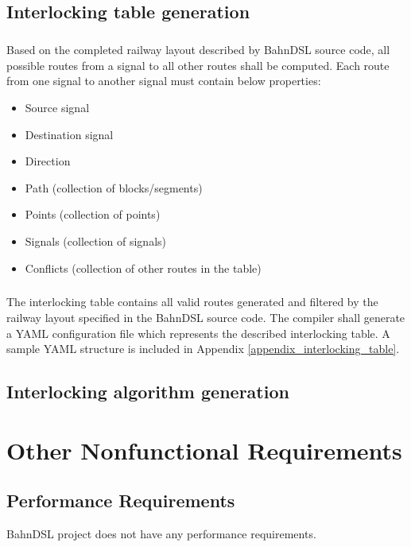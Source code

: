 \documentclass[a4paper,11pt]{scrreprt}
\begin{document}
\section{Interlocking table generation}
\paragraph{}Based on the completed railway layout described by BahnDSL source code, all possible routes from a signal to all other routes shall be computed. Each route from one signal to another signal must contain below properties:
\begin{itemize}
    \item Source signal
    \item Destination signal
    \item Direction
    \item Path (collection of blocks/segments)
    \item Points (collection of points)
    \item Signals (collection of signals)
    \item Conflicts (collection of other routes in the table)
\end{itemize}

\paragraph{}The interlocking table contains all valid routes generated and filtered by the railway layout specified in the BahnDSL source code. The compiler shall generate a YAML configuration file which represents the described interlocking table. A sample YAML structure is included in Appendix \ref{appendix_interlocking_table}.

\section{Interlocking algorithm generation}

\chapter{Other Nonfunctional Requirements}

\section{Performance Requirements}
BahnDSL project does not have any performance requirements.
\end{document}
